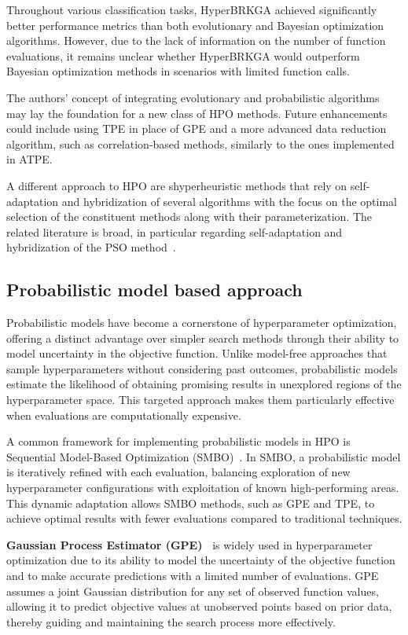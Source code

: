 Throughout various classification tasks, HyperBRKGA achieved significantly better performance metrics than both evolutionary and Bayesian optimization algorithms. However, due to the lack of information on the number of function evaluations, it remains unclear whether HyperBRKGA would outperform Bayesian optimization methods in scenarios with limited function calls.

The authors' concept of integrating evolutionary and probabilistic algorithms may lay the foundation for a new class of HPO methods. Future enhancements could include using TPE in place of GPE and a more advanced data reduction algorithm, such as correlation-based methods, similarly to the ones implemented in ATPE.

A different approach to HPO are shyperheuristic methods that rely on self-adaptation and hybridization of several algorithms with the focus on the optimal selection of the constituent methods along with their parameterization. The related literature is broad, in particular regarding self-adaptation and hybridization of the PSO method~\cite{Okulewiczetal2022,okulewiczetal2020}.  

\subsection{Probabilistic model based approach}
\label{sec:TPE}

Probabilistic models have become a cornerstone of hyperparameter optimization, offering a distinct advantage over simpler search methods through their ability to model uncertainty in the objective function. Unlike model-free approaches that sample hyperparameters without considering past outcomes, probabilistic models estimate the likelihood of obtaining promising results in unexplored regions of the hyperparameter space. This targeted approach makes them particularly effective when evaluations are computationally expensive.

A common framework for implementing probabilistic models in HPO is Sequential Model-Based Optimization (SMBO)~\cite{10.1007/978-3-642-25566-3_40}. In SMBO, a probabilistic model is iteratively refined with each evaluation, balancing exploration of new hyperparameter configurations with exploitation of known high-performing areas. This dynamic adaptation allows SMBO methods, such as GPE and TPE, to achieve optimal results with fewer evaluations compared to traditional techniques.

\textbf{Gaussian Process Estimator (GPE)~\cite{snoek2012practicalbayesianoptimizationmachine}} is widely used in hyperparameter optimization due to its ability to model the uncertainty of the objective function and to make accurate predictions with a limited number of evaluations. GPE assumes a joint Gaussian distribution for any set of observed function values, allowing it to predict objective values at unobserved points based on prior data, thereby guiding and maintaining the search process more effectively.

